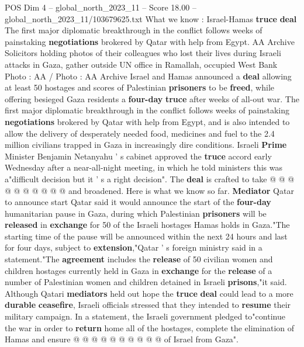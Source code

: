 \begin{textsample}{POS Dim 4 – global\_north\_2023\_11 – Score 18.00 – global\_north\_2023\_11/103679625.txt}  \label{ex:f4_pos_204}
What we know : Israel-Hamas \textbf{truce} \textbf{deal} The first major diplomatic breakthrough in the conflict follows weeks of painstaking \textbf{negotiations} brokered by Qatar with help from Egypt.
AA Archive Solicitors holding photos of their colleagues who lost their lives during Israeli attacks in Gaza, gather outside UN office in Ramallah, occupied West Bank Photo : AA / Photo : AA Archive Israel and Hamas announced a \textbf{deal} allowing at least 50 hostages and scores of Palestinian \textbf{prisoners} to be \textbf{freed}, while offering besieged Gaza residents a \textbf{four-day} \textbf{truce} after weeks of all-out war.
The first major diplomatic breakthrough in the conflict follows weeks of painstaking \textbf{negotiations} brokered by Qatar with help from Egypt, and is also intended to allow the delivery of desperately needed food, medicines and fuel to the 2.4 million civilians trapped in Gaza in increasingly dire conditions.
Israeli \textbf{Prime} Minister Benjamin Netanyahu ' s cabinet approved the \textbf{truce} accord early Wednesday after a near-all-night meeting, in which he told ministers this was a"difficult decision but it ' s a right decision".
The \textbf{deal} is crafted to take @ @ @ @ @ @ @ @ @ @ and broadened.
Here is what we know so far. \textbf{Mediator} Qatar to announce start Qatar said it would announce the start of the \textbf{four-day} humanitarian pause in Gaza, during which Palestinian \textbf{prisoners} will be \textbf{released} in \textbf{exchange} for 50 of the Israeli hostages Hamas holds in Gaza."The starting time of the pause will be announced within the next 24 hours and last for four days, subject to \textbf{extension},"Qatar ' s foreign ministry said in a statement."The \textbf{agreement} includes the \textbf{release} of 50 civilian women and children hostages currently held in Gaza in \textbf{exchange} for the \textbf{release} of a number of Palestinian women and children detained in Israeli \textbf{prisons},"it said.
Although Qatari \textbf{mediators} held out hope the \textbf{truce} \textbf{deal} could lead to a more \textbf{durable} \textbf{ceasefire}, Israeli officials stressed that they intended to \textbf{resume} their military campaign.
In a statement, the Israeli government pledged to"continue the war in order to \textbf{return} home all of the hostages, complete the elimination of Hamas and ensure @ @ @ @ @ @ @ @ @ @ of Israel from Gaza".

\end{textsample}
